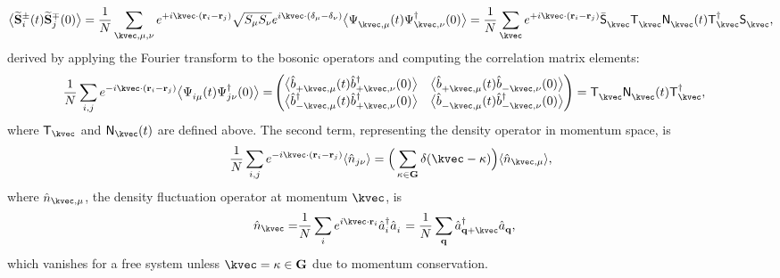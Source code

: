 \begin{equation}
    \big\langle \widetilde{\mathbf{S}}_{i}^{\pm}(t) \widetilde{\mathbf{S}}_{j}^{\mp}(0) \big\rangle
    = \frac{1}{N} \sum_{\kvec, \mu, \nu } 
    e^{ + i \kvec \cdot (\mathbf{r}_{i} - \mathbf{r}_{j} )} 
    \sqrt{S_{\mu} S_{\nu}} 
    e^{ i \kvec \cdot (\mathbf{\delta}_{\mu} - \mathbf{\delta}_{\nu}) }
    \big\langle \Psi_{\kvec, \mu}^{\phantom \dagger}(t) \Psi_{\kvec, \nu}^{\dagger}(0) \big\rangle
    = \frac{1}{N} \sum_{\kvec} 
    e^{ + i \kvec \cdot (\mathbf{r}_{i} - \mathbf{r}_{j} )} 
    \bar{\mathsf{S}}_{\kvec}^{\phantom \dagger} 
    \mathsf{T}_{\kvec}^{\phantom \dagger}
    \mathsf{N}_{\kvec}^{\phantom \dagger} (t)
    \mathsf{T}_{\kvec}^{\dagger} 
    \mathsf{S}_{\kvec}^{\phantom \dagger},
\end{equation}
derived by applying the Fourier transform to the bosonic operators and computing the correlation matrix elements:
\begin{align}
    \frac{1}{N} \sum_{i,j} e^{ - i \kvec \cdot (\mathbf{r}_{i} - \mathbf{r}_{j} )} 
    \big\langle \Psi_{i\mu}^{\phantom \dagger}(t) \Psi_{j\nu}^{\dagger}(0) \big\rangle 
    = & 
    \begin{pmatrix}
        \big\langle \hat{b}_{+\kvec, \mu}^{\phantom \dagger} (t) \hat{b}_{+\kvec, \nu}^{\dagger}          (0) \big\rangle &
        \big\langle \hat{b}_{+\kvec, \mu}^{\phantom \dagger} (t) \hat{b}_{-\kvec, \nu}^{\phantom \dagger} (0) \big\rangle \\
        \big\langle \hat{b}_{-\kvec, \mu}^{\dagger}          (t) \hat{b}_{+\kvec, \nu}^{\dagger}          (0) \big\rangle &
        \big\langle \hat{b}_{-\kvec, \mu}^{\phantom \dagger} (t) \hat{b}_{-\kvec, \nu}^{\dagger}          (0) \big\rangle 
    \end{pmatrix}
    = \mathsf{T}_{\kvec}^{\phantom\dagger} \mathsf{N}_{\kvec}^{\phantom\dagger} (t) \mathsf{T}_{\kvec}^{\dagger},
\end{align}
where $\mathsf{T}_{\kvec}$ and $\mathsf{N}_{\kvec}(t)$ are defined above. The second term, representing the density operator in momentum space, is
\begin{equation}
    \frac{1}{N} \sum_{i,j} e^{- i \kvec \cdot (\mathbf{r}_{i} - \mathbf{r}_{j})} \langle \hat{n}_{j\nu} \rangle
    = \Big( \sum_{\kappa \in \mathbf{G}} \delta(\kvec - \kappa) \Big) \langle \hat{n}_{\kvec, \mu} \rangle,
\end{equation}
where $\hat{n}_{\kvec, \mu}$, the density fluctuation operator at momentum $\kvec$, is
\begin{align*}
    \hat{n}_{\kvec} 
    = & \frac{1}{N} 
    \sum_{i} e^{i \kvec \cdot \mathbf{r}_{i}} \hat{a}^{\dagger}_{i} \hat{a}_{i}^{\phantom \dagger} 
    = \frac{1}{N}  \sum_{\mathbf{q}} \hat{a}_{\mathbf{q} + \kvec}^{\dagger} \hat{a}_{\mathbf{q}}^{\phantom \dagger},
\end{align*}
which vanishes for a free system unless $\kvec = \kappa \in \mathbf{G}$ due to momentum conservation.

